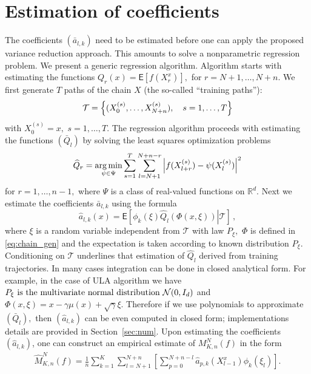 \documentclass[bj]{imsart}
\def\NtrainPath{T}
\def\TrainSet{\mathcal{T}}
\newcommand*{\argmin}{\operatornamewithlimits{arg\,min}}
\begin{document}
\section{Estimation of coefficients}
The coefficients \((\bar a_{l,k})\) need to be estimated before one can apply the proposed variance reduction approach. This amounts to solve a nonparametric regression problem.
We present a generic regression algorithm. Algorithm starts with estimating the functions \(Q_{r}(x)=\mathsf{E}\left[f(X^x_{r})\right],\) for $r=N+1,\ldots,N+n.$ We first generate \(\NtrainPath\)  paths  of the chain \(X\)
(the so-called ``training paths''):
\[
\TrainSet=\Bigl\{(X^{(s)}_{0},\ldots,X^{(s)}_{N+n}),\quad s=1,\ldots,\NtrainPath\Bigr\}
\]
with $X^{(s)}_{0}=x,$ $s=1,\ldots,T.$
The regression algorithm proceeds with estimating the  functions \((\bar Q_{l})\) by solving  the least squares optimization problems
\begin{equation}\label{eq:06042018a1}
\widehat{Q}_r = \argmin_{\psi \in \Psi} \sum_{s = 1}^{T} \sum_{l = N + 1}^{N+n-r} \left| f(X_{l+r}^{(s)}) - \psi(X_l^{(s)})\right|^2
\end{equation}
for \(r=1,\ldots, n-1,\)
where \(\Psi\) is a  class of  real-valued functions on \(\mathbb{R}^d.\)
Next  we estimate the coefficients \( \bar a_{l,k}\) using
the formula
\begin{equation}
\label{eq:a_est_int}
\widehat a_{l,k}(x)=\mathsf{E}\left[\left.\phi_k\left(\xi\right)\widehat Q_{l}\left(\Phi(x,\xi)\right)\right | \TrainSet\right] \,,
\end{equation}
where $\xi$ is a random variable independent from $\mathcal{T}$ with law $P_\xi,$
$\Phi$ is defined in \eqref{eq:chain_gen} and the expectation is taken according to known distribution \(P_\xi\). Conditioning on $\TrainSet$ underlines that estimation of $\widehat Q_{l}$ derived from training trajectories. In many cases integration can be done in closed analytical form. For example, in the case of ULA algorithm we have \(P_\xi$ is the multivariate normal distribution $ \mathcal{N}(0,I_d)\) and \(\Phi(x,\xi)=x-\gamma\mu(x)+\sqrt{\gamma}\xi.\) Therefore if we use polynomials to approximate \((\bar Q_{l}),\) then \((\widehat a_{l,k})\) can be even computed in closed form; implementations details are provided in  Section~\ref{sec:num}.
Upon estimating  the coefficients \((\widehat a_{l,k})\), one can construct an empirical estimate  of \(M_{K,n}^N(f)\) in the form
\begin{eqnarray*}
\widehat M_{K,n}^N(f) =\frac{1}{n}\sum_{k=1}^{K}\sum_{l=N+1}^{N+n}\left[\sum_{p=0}^{N+n-l}\widehat{a}_{p,k}(X_{l-1}^{x})\phi_{k}(\xi_{l})\right].
\end{eqnarray*}
\end{document}
